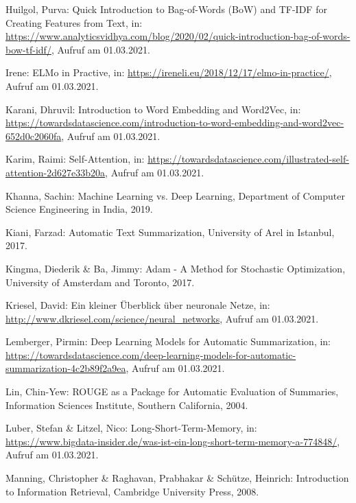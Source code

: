 \begin{thebibliography}{50}
Huilgol, Purva: Quick Introduction to Bag-of-Words (BoW) and TF-IDF for Creating Features from Text, in: \url{https://www.analyticsvidhya.com/blog/2020/02/quick-introduction-bag-of-words-bow-tf-idf/}, Aufruf am 01.03.2021.

Irene: ELMo in Practive, in: \url{https://ireneli.eu/2018/12/17/elmo-in-practice/}, Aufruf am 01.03.2021.

Karani, Dhruvil: Introduction to Word Embedding and Word2Vec, in: \url{https://towardsdatascience.com/introduction-to-word-embedding-and-word2vec-652d0c2060fa}, Aufruf am 01.03.2021.

Karim, Raimi: Self-Attention, in: \url{https://towardsdatascience.com/illustrated-self-attention-2d627e33b20a}, Aufruf am 01.03.2021.

Khanna, Sachin: Machine Learning vs. Deep Learning, Department of Computer Science Engineering in India, 2019.

Kiani, Farzad: Automatic Text Summarization, University of Arel in Istanbul, 2017.

Kingma, Diederik \& Ba, Jimmy: Adam - A Method for Stochastic Optimization, University of Amsterdam and Toronto, 2017.

Kriesel, David: Ein kleiner Überblick über neuronale Netze, in: \url{http://www.dkriesel.com/science/neural_networks}, Aufruf am 01.03.2021.

Lemberger, Pirmin: Deep Learning Models for Automatic Summarization, in: \url{https://towardsdatascience.com/deep-learning-models-for-automatic-summarization-4c2b89f2a9ea}, Aufruf am 01.03.2021.

Lin, Chin-Yew: ROUGE as a Package for Automatic Evaluation of Summaries, Information Sciences Institute, Southern California, 2004.

Luber, Stefan \& Litzel, Nico: Long-Short-Term-Memory, in: \url{https://www.bigdata-insider.de/was-ist-ein-long-short-term-memory-a-774848/}, Aufruf am 01.03.2021.

Manning, Christopher \& Raghavan, Prabhakar \& Schütze, Heinrich: Introduction to Information Retrieval, Cambridge University Press, 2008.


\end{thebibliography}
